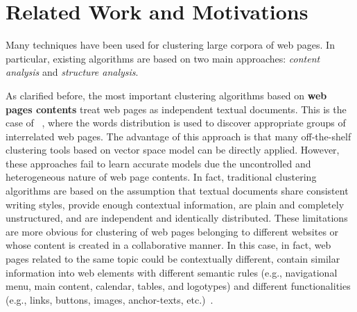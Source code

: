 \color{black}

\section{Related Work and Motivations}
Many techniques have been used for clustering large corpora of web pages. In particular, existing algorithms are based on two main approaches: \emph{content analysis} and \emph{structure analysis}.


As clarified before, the most important clustering algorithms based on \textbf{web pages contents} treat web pages as independent textual documents. This is the case of ~\cite{Anami:2014, Chehreghani:2008, Haveliwala:2002, Zamir:1998}, where the words distribution is used to discover appropriate groups of interrelated web pages. %
 The advantage of this approach is that many off-the-shelf clustering tools based on vector space model can be directly applied.
However, these approaches fail to learn accurate models %
due the uncontrolled and heterogeneous nature of web page contents.
In fact, traditional clustering algorithms are based on the assumption that textual documents share consistent writing styles, provide enough contextual information, are plain and completely unstructured, and are independent and identically distributed. 
These limitations are more obvious for clustering of web pages belonging to different websites or whose content is created in a collaborative manner. In this case, in fact,  web pages related to the same topic could be contextually different, contain similar information into web elements with different semantic rules (e.g., navigational menu, main content, calendar, tables, and logotypes) and different functionalities (e.g., links, buttons, images, anchor-texts, etc.)~\cite{Qi:2009}. 



